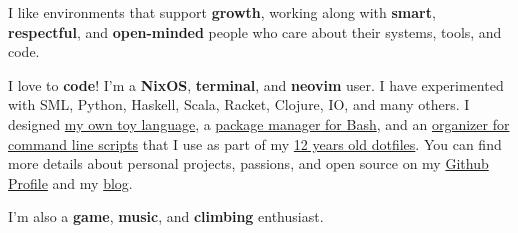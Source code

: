 \documentclass[10pt,a4paper,ragged2e,withhyper]{altacv}
\begin{document}
\begin{paracol}{2}
\begingroup
\setlength{\parskip}{1em}

I like environments that support \textbf{growth}, working along with \textbf{smart}, \textbf{respectful}, and \textbf{open-minded} people who care about their systems, tools, and code.

I love to \textbf{code}! I'm a \textbf{NixOS}, \textbf{terminal}, and \textbf{neovim} user. I have experimented with SML, Python, Haskell, Scala, Racket, Clojure, IO, and many others. I designed \href{https://github.com/juanibiapina/marco}{my own toy language}, a \href{https://github.com/basherpm/basher}{package manager for Bash}, and an \href{https://github.com/juanibiapina/sub}{organizer for command line scripts} that I use as part of my \href{https://github.com/juanibiapina/dotfiles}{12 years old dotfiles}. You can find more details about personal projects, passions, and open source on my \href{https://github.com/juanibiapina/}{Github Profile} and my \href{https://juanibiapina.github.io/}{blog}.

I’m also a \textbf{game}, \textbf{music}, and \textbf{climbing} enthusiast.

\endgroup

%
%
%
%



\medskip



%
%
%


\end{paracol}
\end{document}
